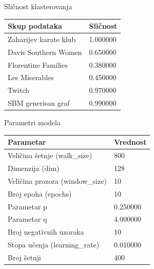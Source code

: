 \documentclass{beamer}
\begin{document}
\begin{frame}{Sličnost klasterovanja}
    \centering
    \begin{table}
        \label{tab:4.11}
        \begin{tabular}{p{1.5in}p{1in}}
        \hline
        Skup podataka & Sličnost \\
        \hline
        Zaharijev karate klub & 1.000000 \\
        Davis Southern Women & 0.650000 \\
        Florentine Families & 0.380000 \\
        Les Miserables & 0.450000 \\
        Twitch & 0.970000 \\
        SBM generisan graf & 0.990000 \\
        \hline
    \end{tabular}
    \end{table}
\end{frame}

\begin{frame}{Parametri modela}
    \centering
    \begin{table}
        \label{tab:4.12}
        \begin{tabular}{p{2.5in}p{1in}}
        \hline
        Parametar & Vrednost \\
        \hline
        Veličina šetnje (walk\_size) & 800 \\
        Dimenzija (dim) & 128 \\
        Veličina prozora (window\_size) & 10 \\
        Broj epoha (epochs) & 10 \\
        Parametar p & 0.250000 \\
        Parametar q & 4.000000 \\
        Broj negativnih uzoraka & 10 \\
        Stopa učenja (learning\_rate) & 0.010000 \\
        Broj šetnji & 400 \\
        \hline
    \end{tabular}
\end{table}
\end{frame}
\end{document}
